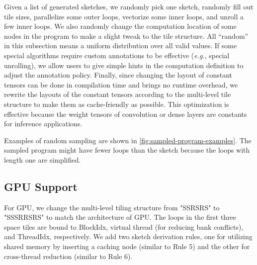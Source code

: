 Given a list of generated sketches, we randomly pick one sketch, randomly fill out tile sizes, parallelize some outer loops, vectorize some inner loops, and unroll a few inner loops.
We also randomly change the computation location of some nodes in the program to make a slight tweak to the tile structure.
All ``random'' in this subsection means a uniform distribution over all valid values.
If some special algorithms require custom annotations to be effective (\textit{e.g.}, special unrolling), we allow users to give simple hints in the computation definition to adjust the annotation policy.
Finally, since changing the layout of constant tensors can be done in compilation time and brings no runtime overhead, we rewrite the layouts of the constant tensors according to the multi-level tile structure to make them as cache-friendly as possible.
This optimization is effective because the weight tensors of convolution or dense layers are constants for inference applications.

Examples of random sampling are shown in \autoref{fig:sampled-program-examples}.
The sampled program might have fewer loops than the sketch because the loops with length one are simplified.

\subsection{GPU Support}
\label{subsec:gpu-support}

For GPU, we change the  multi-level tiling structure from "SSRSRS" to "SSSRRSRS" to match the architecture of GPU. The loops in the first three space tiles are bound to BlockIdx, virtual thread (for reducing bank conflicts), and ThreadIdx, respectively. We add two sketch derivation rules, one for utilizing shared memory by inserting a caching node (similar to Rule 5) and the other for cross-thread reduction (similar to Rule 6).


